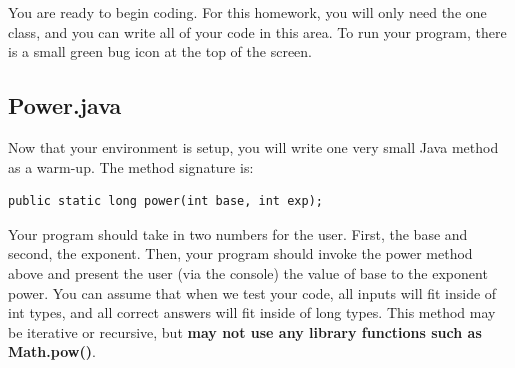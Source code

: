 \documentclass[paper=a4, fontsize=11pt, parskip=full]{scrartcl} %
\numberwithin{equation}{section} %
\numberwithin{figure}{section} %
\numberwithin{table}{section} %
\begin{document}
You are ready to begin coding. For this homework, you will only need the one class, and you can write all of your code in this area. To run your program, there is a small green bug icon at the top of the screen. 



\subsection{Power.java}

Now that your environment is setup, you will write one very small Java method as a warm-up. The method signature is:

\begin{lstlisting}
public static long power(int base, int exp);
\end{lstlisting}

Your program should take in two numbers for the user. First, the base and second, the exponent. Then, your program should invoke the power method above and present the user (via the console) the value of base to the exponent power. You can assume that when we test your code, all inputs will fit inside of int types, and all correct answers will fit inside of long types. This method may be iterative or recursive, but \textbf{may not use any library functions such as Math.pow()}.




\end{document}
